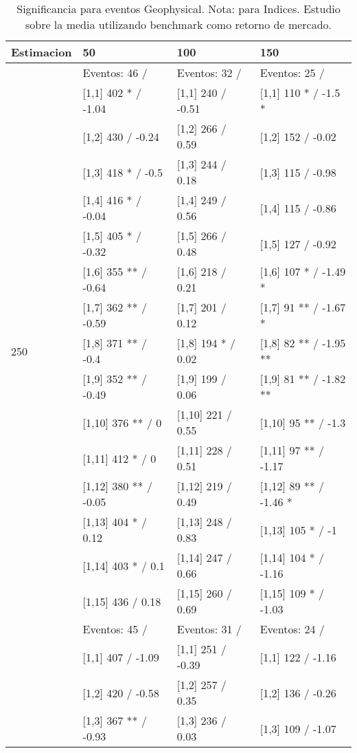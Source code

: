 \begin{table}

\caption{Significancia para eventos Geophysical. Nota: para Indices. Estudio sobre la media utilizando benchmark como retorno de mercado.}
\centering
\begin{tabular}[t]{llll}
\toprule
Estimacion & 50 & 100 & 150\\
\midrule
 & Eventos:  46 / & Eventos:  32 / & Eventos:  25 /\\
 & {}[1,1] 402 * / -1.04 & {}[1,1] 240  / -0.51 & {}[1,1] 110 * / -1.5 *\\
 & {}[1,2] 430  / -0.24 & {}[1,2] 266  / 0.59 & {}[1,2] 152  / -0.02\\
 & {}[1,3] 418 * / -0.5 & {}[1,3] 244  / 0.18 & {}[1,3] 115  / -0.98\\
 & {}[1,4] 416 * / -0.04 & {}[1,4] 249  / 0.56 & {}[1,4] 115  / -0.86\\
\addlinespace
 & {}[1,5] 405 * / -0.32 & {}[1,5] 266  / 0.48 & {}[1,5] 127  / -0.92\\
 & {}[1,6] 355 ** / -0.64 & {}[1,6] 218  / 0.21 & {}[1,6] 107 * / -1.49 *\\
 & {}[1,7] 362 ** / -0.59 & {}[1,7] 201  / 0.12 & {}[1,7] 91 ** / -1.67 *\\
250 & {}[1,8] 371 ** / -0.4 & {}[1,8] 194 * / 0.02 & {}[1,8] 82 ** / -1.95 **\\
 & {}[1,9] 352 ** / -0.49 & {}[1,9] 199  / 0.06 & {}[1,9] 81 ** / -1.82 **\\
\addlinespace
 & {}[1,10] 376 ** / 0 & {}[1,10] 221  / 0.55 & {}[1,10] 95 ** / -1.3\\
 & {}[1,11] 412 * / 0 & {}[1,11] 228  / 0.51 & {}[1,11] 97 ** / -1.17\\
 & {}[1,12] 380 ** / -0.05 & {}[1,12] 219  / 0.49 & {}[1,12] 89 ** / -1.46 *\\
 & {}[1,13] 404 * / 0.12 & {}[1,13] 248  / 0.83 & {}[1,13] 105 * / -1\\
 & {}[1,14] 403 * / 0.1 & {}[1,14] 247  / 0.66 & {}[1,14] 104 * / -1.16\\
\addlinespace
 & {}[1,15] 436  / 0.18 & {}[1,15] 260  / 0.69 & {}[1,15] 109 * / -1.03\\
 & Eventos:  45 / & Eventos:  31 / & Eventos:  24 /\\
 & {}[1,1] 407  / -1.09 & {}[1,1] 251  / -0.39 & {}[1,1] 122  / -1.16\\
 & {}[1,2] 420  / -0.58 & {}[1,2] 257  / 0.35 & {}[1,2] 136  / -0.26\\
 & {}[1,3] 367 ** / -0.93 & {}[1,3] 236  / 0.03 & {}[1,3] 109  / -1.07\\

\end{tabular}
\end{table}
